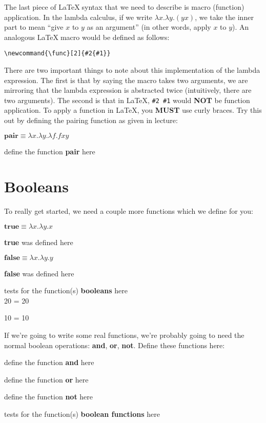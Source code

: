 \documentclass{article}
\newcommand{\op}[1]{\textbf{#1}}
\newcommand{\lcalc}[1]{\begin{center}\ensuremath{#1}\end{center}}
\newcommand{\begintodo}[1]{\begin{center}define the function \op{#1} here\end{center}}
\newcommand{\begindone}[1]{\begin{center}\op{#1} was defined here\end{center}}
\newcommand{\finishtodo}[1]{}
\newcommand{\finishdone}[1]{}
\newcommand{\test}[2]{#1 = #2\par}
\newcommand{\begintests}[1]{\begin{center}tests for the function(s) \op{#1} here\\}
\newcommand{\finishtests}[1]{\end{center}}
\begin{document}
The last piece of \LaTeX$\;$syntax that we need to describe is macro (function) application.  In the lambda calculus, if we write $\lambda x. \lambda y. (y x)$, we take
the inner part to mean ``give $x$ to $y$ as an argument'' (in other words, apply $x$ to $y$).  An analogous \LaTeX$\;$macro would be defined as follows:
\begin{center}
    \verb+\newcommand{\func}[2]{#2{#1}}+
\end{center}
There are two important things to note about this implementation of the lambda expression.  The first is that by saying the macro takes two arguments, we are mirroring that
the lambda expression is abstracted twice (intuitively, there are two arguments).  The second is that in \LaTeX, \verb+#2 #1+ would \textbf{NOT} be function application.
To apply a function in \LaTeX, you \textbf{MUST} use curly braces.  Try this out by defining the pairing function as given in lecture:

\lcalc{\op{pair} \equiv \lambda x. \lambda y. \lambda f. f x y}

\begintodo{pair}
\newcommand{\pair}{}
\finishtodo{pair}

\section{Booleans}
To really get started, we need a couple more functions which we define for you:

\lcalc{\op{true} \equiv \lambda x . \lambda y. x}
\begindone{true}
\newcommand{\true}[2]{#1}
\finishdone{true}

\lcalc{\op{false} \equiv \lambda x . \lambda y. y}
\begindone{false}
\newcommand{\false}[2]{#2}
\finishdone{false}

\begintests{booleans}
\test{\false{10}{20}}{20}
\test{\true{10}{20}}{10}
\finishtests{booleans}

If we're going to write some real functions, we're probably going to need the normal 
boolean operations: \op{and}, \op{or}, \op{not}.  Define these functions here:

\begintodo{and}
\newcommand{\cAnd}[2]{}
\finishtodo{and}

\begintodo{or}
\newcommand{\cOr}[2]{}
\finishtodo{or}

\begintodo{not}
\newcommand{\cNot}[3]{}
\finishtodo{not}

\begintests{boolean functions}
\finishtests{boolean functions}
\end{document}
